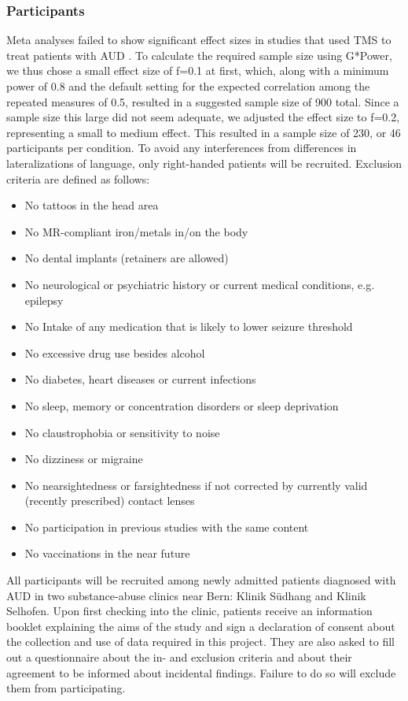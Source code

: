 \documentclass[12pt]{article}
\begin{document}
\subsubsection{Participants}

Meta analyses failed to show significant effect sizes in studies that used TMS to treat patients with AUD \parencite{mostafaviNoninvasiveBrainStimulation2020, zhangEffectsRepetitiveTranscranial2019}. To calculate the required sample size using G*Power, we thus chose a small effect size of f=0.1 at first, which, along with a minimum power of 0.8 and the default setting for the expected correlation among the repeated measures of 0.5, resulted in a suggested sample size of 900 total. Since a sample size this large did not seem adequate, we adjusted the effect size to f=0.2, representing a small to medium effect. This resulted in a sample size of 230, or 46 participants per condition. 
To avoid any interferences from differences in lateralizations of language, only right-handed patients will be recruited. Exclusion criteria are defined as follows:

\begin{itemize}
\item No tattoos in the head area 
\item No MR-compliant iron/metals in/on the body
\item No dental implants (retainers are allowed)
\item No neurological or psychiatric history or current medical conditions, e.g. epilepsy
\item No Intake of any medication that is likely to lower seizure threshold
\item No excessive drug use besides alcohol
\item No diabetes, heart diseases or current infections
\item No sleep, memory or concentration disorders or sleep deprivation
\item No claustrophobia or sensitivity to noise
\item No dizziness or migraine 
\item No nearsightedness or farsightedness if not corrected by currently valid (recently prescribed) contact lenses
\item No participation in previous studies with the same content  
\item No vaccinations in the near future 
\end{itemize}

All participants will be recruited among newly admitted patients diagnosed with AUD in two substance-abuse clinics near Bern: Klinik Südhang and Klinik Selhofen. Upon first checking into the clinic, patients receive an information booklet explaining the aims of the study and sign a declaration of consent about the collection and use of data required in this project. They are also asked to fill out a questionnaire about the in- and exclusion criteria and about their agreement to be informed about incidental findings. Failure to do so will exclude them from participating.
\end{document}
